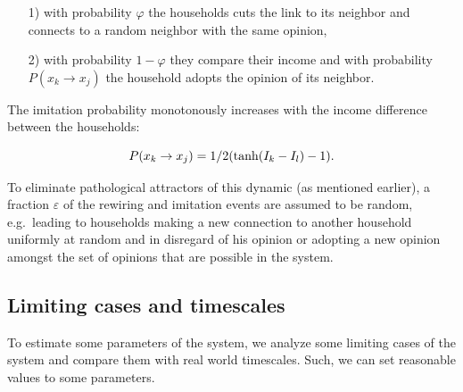 \begin{itemize}
	\item [1)] with probability $\varphi$ the households cuts the link to its neighbor and connects to a random neighbor with the same opinion,
	\item [2)] with probability $1-\varphi$ they compare their income and with probability $P(x_k \rightarrow x_j)$ the household adopts the opinion of its neighbor.
\end{itemize}
The imitation probability monotonously increases with the income difference between the households: 

\begin{equation} 
	P(x_k \rightarrow x_j) = 1/2 ({\rm tanh}(I_k - I_l)-1).
	\label{primitive_imitation_probability}
\end{equation}

To eliminate pathological attractors of this dynamic (as mentioned earlier), a fraction $\varepsilon$ of the rewiring and imitation events are assumed to be random, e.g.\ leading to households making a new connection to another household uniformly at random and in disregard of his opinion or adopting a new opinion amongst the set of opinions that are possible in the system.

\newpage
\subsection{Limiting cases and timescales}
To estimate some parameters of the system, we analyze some limiting cases of the system and compare them with real world timescales. Such, we can set reasonable values to some parameters.
